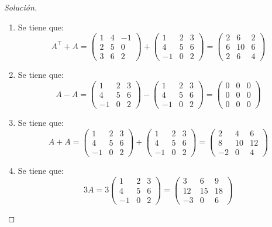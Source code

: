\documentclass[a4,11pt]{aleph-notas}
\begin{document}
\begin{proof}[Solución]\hspace{0pt}
    \begin{enumerate}
    \item Se tiene que:
    \[
    A^\intercal + A 
    = \begin{pmatrix} 1 & 4 & -1\\ 2 & 5 & 0 \\  3 & 6 &2\end{pmatrix} +
      \begin{pmatrix} 1 & 2 & 3 \\ 4 & 5 & 6 \\ -1 & 0 &2\end{pmatrix} 
    = \begin{pmatrix} 2 & 6 & 2 \\ 6 & 10& 6 \\  2 & 6 & 4  \end{pmatrix}
    \]
    \item Se tiene que:
    \[
    A - A 
    = \begin{pmatrix} 1 & 2 & 3 \\ 4 & 5 & 6 \\ -1 & 0 & 2\end{pmatrix}
    - \begin{pmatrix} 1 & 2 & 3 \\ 4 & 5 & 6 \\ -1 & 0 & 2\end{pmatrix}
    = \begin{pmatrix} 0 & 0 & 0 \\ 0 & 0 & 0 \\  0 & 0 & 0\end{pmatrix}
    \]
    \item Se tiene que:
    \[
    A + A 
    = \begin{pmatrix} 1 & 2 & 3 \\ 4 & 5 & 6 \\ -1 & 0 & 2\end{pmatrix}
    + \begin{pmatrix} 1 & 2 & 3 \\ 4 & 5 & 6 \\ -1 & 0 & 2\end{pmatrix}
    = \begin{pmatrix} 2 & 4 & 6 \\ 8 & 10 & 12 \\ -2 & 0 & 4\end{pmatrix}
    \]
    \item Se tiene que:
    \[
    3A 
    = 3\begin{pmatrix} 1 & 2 & 3 \\ 4 & 5 & 6 \\ -1 & 0 & 2\end{pmatrix}
    =  \begin{pmatrix} 3 & 6 & 9 \\ 12 & 15 & 18 \\ -3 & 0 & 6\end{pmatrix}
    \]
\end{enumerate}
\end{proof}
\end{document}
